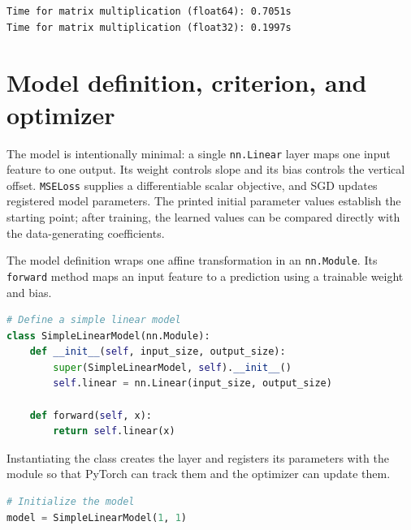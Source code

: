 \documentclass[../labs.tex]{subfiles}
\begin{document}
\label{res:lab01_cell_006}

\begin{lstlisting}[style=terminalOutput]
Time for matrix multiplication (float64): 0.7051s
Time for matrix multiplication (float32): 0.1997s
\end{lstlisting}
\section{Model definition, criterion, and optimizer}

The model is intentionally minimal: a single \texttt{nn.Linear} layer maps one input feature to one output. Its weight controls slope and its bias controls the vertical offset. \texttt{MSELoss} supplies a differentiable scalar objective, and SGD updates registered model parameters. The printed initial parameter values establish the starting point; after training, the learned values can be compared directly with the data-generating coefficients.


\noindent The model definition wraps one affine transformation in an \texttt{nn.Module}. Its \texttt{forward} method maps an input feature to a prediction using a trainable weight and bias.\par
\begin{lstlisting}[language=Python,basicstyle=\ttfamily\scriptsize,breaklines=true,breakatwhitespace=false,columns=fullflexible,keepspaces=true,numbers=none]
# Define a simple linear model
class SimpleLinearModel(nn.Module):
    def __init__(self, input_size, output_size):
        super(SimpleLinearModel, self).__init__()
        self.linear = nn.Linear(input_size, output_size)
    
    def forward(self, x):
        return self.linear(x)
\end{lstlisting}

\label{res:lab01_cell_011}



\noindent Instantiating the class creates the layer and registers its parameters with the module so that PyTorch can track them and the optimizer can update them.\par
\begin{lstlisting}[language=Python,basicstyle=\ttfamily\scriptsize,breaklines=true,breakatwhitespace=false,columns=fullflexible,keepspaces=true,numbers=none]
# Initialize the model
model = SimpleLinearModel(1, 1)
\end{lstlisting}
\end{document}
